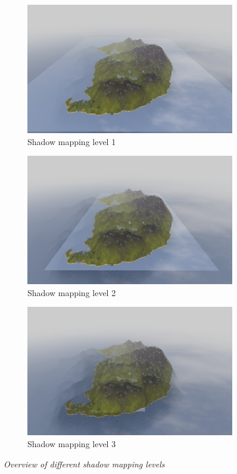 \begin{figure}[H]
\begin{subfigure}{.33\textwidth}
  \centering
  \includegraphics[width=0.9\linewidth]{images/SMOverViewLvl1.jpg}
  \caption{Shadow mapping level 1}
  \label{fig:SMOverViewLvl1}
\end{subfigure}%
\begin{subfigure}{.33\textwidth}
  \centering
  \includegraphics[width=0.9\linewidth]{images/SMOverViewLvl2.jpg}
  \caption{Shadow mapping level 2}
  \label{fig:SMOverViewLvl2}
\end{subfigure}
\begin{subfigure}{.33\textwidth}
  \centering
  \includegraphics[width=0.9\linewidth]{images/SMOverViewLvl3.jpg}
  \caption{Shadow mapping level 3}
  \label{fig:SMOverViewLvl3}
\end{subfigure}
\caption[Noise comparison]{\textit{Overview of different shadow mapping levels}}
\label{fig:SMOverViewComparison}
\end{figure}

